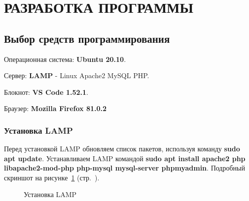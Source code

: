 \newpage

\section{РАЗРАБОТКА ПРОГРАММЫ}

\subsection{Выбор средств программирования}

Операционная система: \textbf{Ubuntu 20.10}.

Сервер: \textbf{LAMP} - Linux Apache2 MySQL PHP.

Блокнот: \textbf{VS Code 1.52.1}.

Браузер: \textbf{Mozilla Firefox 81.0.2}

\subsubsection{Установка LAMP}

Перед установкой LAMP обновляем список пакетов, используя команду \textbf{sudo apt update}. Устанавливаем LAMP командой \textbf{sudo apt install apache2 php libapache2-mod-php php-mysql mysql-server phpmyadmin}. Подробный скриншот на рисунке~\ref{fig:sudo-apt-install-apache2} (стр.~\pageref{fig:sudo-apt-install-apache2}).

\begin{figure}[!htp]
    \caption{Установка LAMP}
    \label{fig:sudo-apt-install-apache2}
\end{figure}

